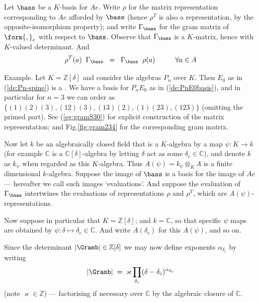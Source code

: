 \documentclass[reqno,10pt,a4paper]{amsart}
\newcommand{\C}{\mathbb{C}}
\newcommand{\Z}{\mathbb{Z}}
\newcommand{\beq}{\begin{equation}}
\newcommand{\eq}{\end{equation}}
\newcommand{\red}[1]{\textcolor{red}{#1}}
\newcommand{\ppm}[1]{\red{#1}}
\newcommand{\ppmy}[1]{}   %
\newcommand{\ppmm}[1]{{#1}}
\newcommand{\Gram}{\Gamma}
\begin{document}
Let $\bass$ be a $K$-basis for $Ae$. 
Write $\rho$ for the matrix representation corresponding to 
$Ae$ afforded by $\bass$ 
(hence $\rho^T$ is also a representation,
\ppmm{by the opposite-isomorphism property});
and 
write 
$\Gram_{\bass}$ for the gram matrix of $\form{,}_e$ 
with respect to $\bass$. 
Observe that $ \Gram_{\bass}$ is a $K$-matrix, hence with $K$-valued determinant.
And
\beq  \label{eq:intert2} 
\rho^T(a) \;\; \Gram_{\bass} \;\; = \;\; \Gram_{\bass} \;\; \rho(a) \hspace{1cm} \forall a \in A
\eq 


\mdef
Example. Let $K=\Z[\delta]$ and consider the algebras $P_n$ over $K$. 
Then $E_0$ as in (\ref{de:Pn-spine}) is a \herpre.
We have a basis for $P_n E_0$ as in (\ref{de:PnE0basis}), and in particular for $n=3$ we can order
as $\{ (1)(2)(3), (12)(3), (13)(2), (1)(23), (123) \}$ (omitting the primed part). 
See (\ref{eg:gramS30}) for explicit construction of the matrix representation; and Fig.\ref{fig:gram234} 
for the corresponding gram matrix. 
\ppmy{...
\ppm{[why ... here?]}
}

\mdef 
Now let $k$ be an algebraically closed field that is a $K$-algebra by a map $\psi:K \rightarrow k$
(for example $\C$ is a $\C[\delta]$-algebra by letting $\delta$ act as some $\delta_c \in \C$),
and denote $k$ as $k_{\psi}$ when regarded as this $K$-algebra.
Thus $A(\psi) =  k_{\psi} \otimes_{K} A $  is a finite dimensional $k$-algebra. 
Suppose the image of $\bass$ is a basis for the image of $Ae$
--- hereafter we call such images `evaluations'. 
And suppose the evaluation of $ \Gram_{\bass} $ intertwines the evaluations of representations
$\rho $ and $\rho^T$, which are $A(\psi)$-representations. 

Now suppose in particular that $K=\Z[\delta]$; and $k= \C$, so that 
specific 
$\psi$ maps are obtained by 
$\psi: \delta \mapsto \delta_c \in \C$. And write $A(\delta_c)$ for this $A(\psi)$, and so on. 

Since 
the determinant 
$|\Gramb| \in \Z[\delta]$ 
we may now define exponents $\alpha_{\delta_c}$ by writing 
\beq  \label{eq:gramfactor2}
|\Gramb |  \; = \; \varkappa \prod_{\delta_c} (\delta-\delta_c)^{\alpha_{\delta_{c}}} 
\eq 
(note $\varkappa \in \Z$) 
--- factorising if necessary over $\C$ by the algebraic closure of $\C$. 
\end{document}
